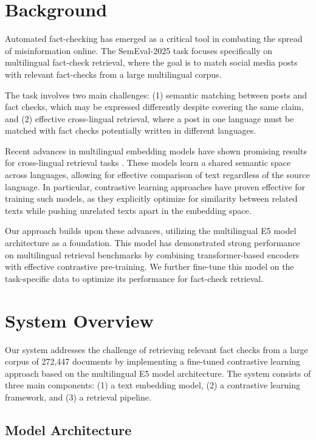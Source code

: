 \documentclass[11pt]{article}
\begin{document}
\section{Background}

Automated fact-checking has emerged as a critical tool in combating the spread of misinformation online. The SemEval-2025 task focuses specifically on multilingual fact-check retrieval, where the goal is to match social media posts with relevant fact-checks from a large multilingual corpus.

The task involves two main challenges: (1) semantic matching between posts and fact checks, which may be expressed differently despite covering the same claim, and (2) effective cross-lingual retrieval, where a post in one language must be matched with fact checks potentially written in different languages.

Recent advances in multilingual embedding models have shown promising results for cross-lingual retrieval tasks \cite{feng2022languageagnosticbertsentenceembedding, litschko2022crosslingual}. These models learn a shared semantic space across languages, allowing for effective comparison of text regardless of the source language. In particular, contrastive learning approaches have proven effective for training such models, as they explicitly optimize for similarity between related texts while pushing unrelated texts apart in the embedding space.

Our approach builds upon these advances, utilizing the multilingual E5 model architecture \cite{wang2024multilingual} as a foundation. This model has demonstrated strong performance on multilingual retrieval benchmarks by combining transformer-based encoders with effective contrastive pre-training. We further fine-tune this model on the task-specific data to optimize its performance for fact-check retrieval.

\section{System Overview}

Our system addresses the challenge of retrieving relevant fact checks from a large corpus of 272,447 documents by implementing a fine-tuned contrastive learning approach based on the multilingual E5 model architecture. The system consists of three main components: (1) a text embedding model, (2) a contrastive learning framework, and (3) a retrieval pipeline.

\subsection{Model Architecture}
\end{document}
